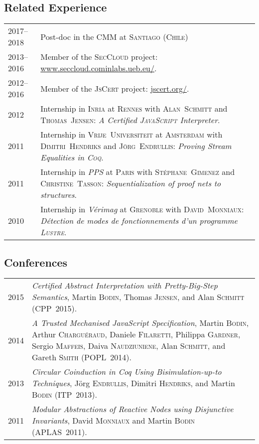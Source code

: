 \documentclass[12pt,a4paper]{article}
\makeatletter
\newcommand{\fr}[1]{\foreignlanguage{francais}{\textit{#1}}}
\newenvironment{datecvsection}[1]%
               {\subsection*{#1}%
                 \noindent \begin{tabular}{@{}p{\annee}p{\texte}@{}}}
               {\end{tabular}}
\makeatother
\begin{document}
\begin{datecvsection}{Related Experience}

    2017–2018 & Post-doc in the \textsc{CMM} at \textsc{Santiago} (\textsc{Chile}) \\

	2013–2016 & Member of the \textsc{SecCloud} project:  \url{www.seccloud.cominlabs.ueb.eu/}. \\

	2012–2016 & Member of the \textsc{JsCert} project:  \url{jscert.org/}. \\

	2012 & Internship in \textsc{Inria} at \textsc{Rennes} with \textsc{Alan~Schmitt} and \textsc{Thomas~Jensen}:
	\textit{A Certified \textsc{JavaScript} Interpreter}. \\

	2011 & Internship in \textsc{Vrĳe~Universiteit} at \textsc{Amsterdam} with \textsc{Dimitri~Hendriks} and \textsc{Jörg~Endrullis}:
	\textit{Proving Stream Equalities in \textsc{Coq}}. \\

	2011 & Internship in \fr{\sc PPS} at \textsc{Paris} with \textsc{Stéphane~Gimenez} and \textsc{Christine~Tasson}:
	\textit{Sequentialization of proof nets to structures}. \\

	2010 & Internship in \fr{\sc Vérimag} at \textsc{Grenoble} with \textsc{David~Monniaux}:
        \fr{Détection de modes de fonctionnements d’un programme \textsc{Lustre}}. \\

\end{datecvsection}

\begin{datecvsection}{Conferences}

  2015 & \textit{Certified Abstract Interpretation with Pretty-Big-Step Semantics}, Martin \textsc{Bodin}, Thomas \textsc{Jensen}, and Alan \textsc{Schmitt} (CPP~2015). \\

  2014 & \textit{A Trusted Mechanised JavaScript Specification}, Martin \textsc{Bodin}, Arthur \textsc{Charguéraud}, Daniele \textsc{Filaretti}, Philippa \textsc{Gardner}, Sergio \textsc{Maffeis}, Daiva \textsc{Naudziuniene}, Alan \textsc{Schmitt}, and Gareth \textsc{Smith} (POPL~2014). \\

  2013 & \textit{Circular Coinduction in Coq Using Bisimulation-up-to Techniques}, Jörg \textsc{Endrullis}, Dimitri \textsc{Hendriks}, and Martin \textsc{Bodin} (ITP~2013). \\

  2011 & \textit{Modular Abstractions of Reactive Nodes using Disjunctive Invariants}, David \textsc{Monniaux} and Martin \textsc{Bodin} (APLAS~2011). \\

\end{datecvsection}
\end{document}
